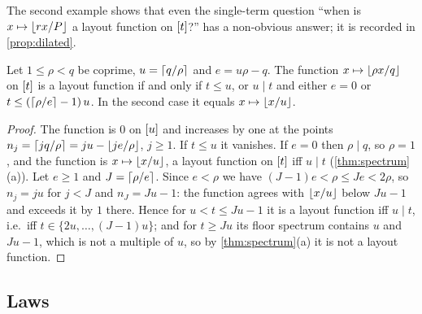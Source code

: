 The second example shows that even the single-term question ``when is $x\mapsto\left\lfloor rx/P \right\rfloor$ a
layout function on $[t]$?'' has a non-obvious answer; it is recorded in \cref{prop:dilated}.

\begin{proposition}\label{prop:dilated}
Let $1\le\rho<q$ be coprime, $u=\left\lceil q/\rho \right\rceil$ and $e=u\rho-q$. The function
$x\mapsto\left\lfloor \rho x/q \right\rfloor$ on $[t]$ is a layout function if and only if $t\le u$, or $u\mid t$
and either $e=0$ or $t\le(\left\lceil \rho/e \right\rceil-1)\,u$. In the second case it equals $x\mapsto\left\lfloor x/u \right\rfloor$.
\end{proposition}
\begin{proof}
The function is $0$ on $[u]$ and increases by one at the points
$n_j=\left\lceil jq/\rho \right\rceil=ju-\left\lfloor je/\rho \right\rfloor$, $j\ge1$. If $t\le u$ it vanishes. If $e=0$ then
$\rho\mid q$, so $\rho=1$, and the function is $x\mapsto\left\lfloor x/u \right\rfloor$, a layout function on
$[t]$ iff $u\mid t$ (\cref{thm:spectrum}(a)). Let $e\ge1$ and $J=\left\lceil \rho/e \right\rceil$. Since
$e<\rho$ we have $(J-1)e<\rho\le Je<2\rho$, so $n_j=ju$ for $j<J$ and $n_J=Ju-1$: the function
agrees with $\left\lfloor x/u \right\rfloor$ below $Ju-1$ and exceeds it by $1$ there. Hence for $u<t\le Ju-1$ it
is a layout function iff $u\mid t$, i.e.\ iff $t\in\{2u,\dots,(J-1)u\}$; and for $t\ge Ju$ its
floor spectrum contains $u$ and $Ju-1$, which is not a multiple of $u$, so by
\cref{thm:spectrum}(a) it is not a layout function.
\end{proof}

\subsection{Laws}\label{sec:laws}

